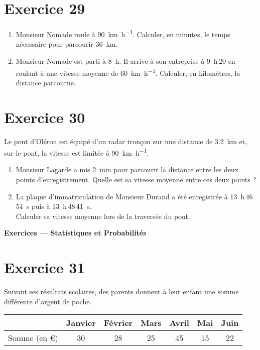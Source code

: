 \documentclass[a4paper,11pt]{article}
\begin{document}
\bigskip
\section*{Exercice 29}
\begin{enumerate}
  \item Monsieur Nomade roule à \SI{90}{\kilo\meter\per\hour}. Calculer, en minutes, le temps nécessaire pour parcourir \SI{36}{\kilo\meter}.
  \item Monsieur Nomade est parti à \SI{8}{h}. Il arrive à son entreprise à \SI{9}{h}\,20 en roulant à une vitesse moyenne de \SI{60}{\kilo\meter\per\hour}. Calculer, en kilomètres, la distance parcourue.
\end{enumerate}

\bigskip
\section*{Exercice 30}
Le pont d’Oléron est équipé d’un radar tronçon sur une distance de \SI{3,2}{\kilo\meter} et, sur le pont, la vitesse est limitée à \SI{90}{\kilo\meter\per\hour}.
\begin{enumerate}
  \item Monsieur Lagarde a mis \SI{2}{\minute} pour parcourir la distance entre les deux points d’enregistrement. Quelle est sa vitesse moyenne entre ces deux points ?
  \item La plaque d’immatriculation de Monsieur Durand a été enregistrée à \SI{13}{h}\,46\,\SI{54}{s} puis à \SI{13}{h}\,48\,\SI{41}{s}.\\
  Calculer sa vitesse moyenne lors de la traversée du pont.
\end{enumerate}



{\Large \textbf{Exercices — Statistiques et Probabilités}}\par\medskip

\bigskip
\section*{Exercice 31}
Suivant ses résultats scolaires, des parents donnent à leur enfant une somme différente d’argent de poche.
\medskip

\begin{tabular}{|c|cccccc|}
\hline
 & Janvier & Février & Mars & Avril & Mai & Juin\\
\hline
Somme (en \euro) & 30 & 28 & 25 & 45 & 15 & 22\\
\hline
\end{tabular}
\end{document}
